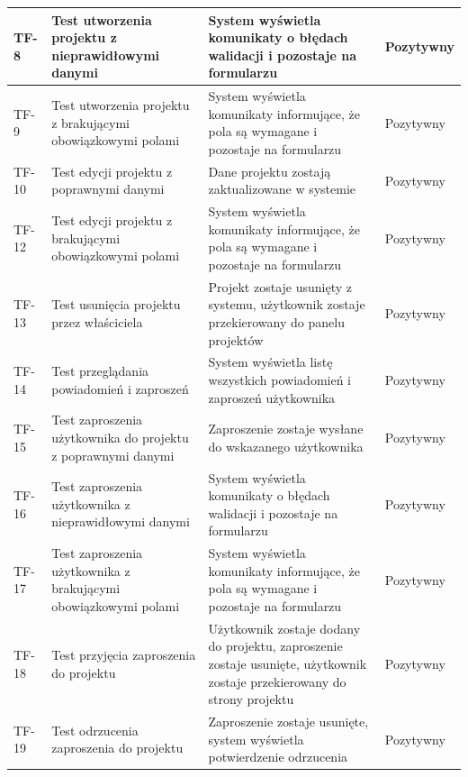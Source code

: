 \begin{longtable}{|p{2cm}|p{6cm}|p{5cm}|p{2.5cm}|}
TF-8 & Test utworzenia projektu z nieprawidłowymi danymi & System wyświetla komunikaty o błędach walidacji i pozostaje na formularzu & Pozytywny \\ \hline

TF-9 & Test utworzenia projektu z brakującymi obowiązkowymi polami & System wyświetla komunikaty informujące, że pola są wymagane i pozostaje na formularzu & Pozytywny \\ \hline

TF-10 & Test edycji projektu z poprawnymi danymi & Dane projektu zostają zaktualizowane w systemie & Pozytywny \\ \hline

TF-12 & Test edycji projektu z brakującymi obowiązkowymi polami & System wyświetla komunikaty informujące, że pola są wymagane i pozostaje na formularzu & Pozytywny \\ \hline

TF-13 & Test usunięcia projektu przez właściciela & Projekt zostaje usunięty z systemu, użytkownik zostaje przekierowany do panelu projektów & Pozytywny \\ \hline

TF-14 & Test przeglądania powiadomień i zaproszeń & System wyświetla listę wszystkich powiadomień i zaproszeń użytkownika & Pozytywny \\ \hline

TF-15 & Test zaproszenia użytkownika do projektu z poprawnymi danymi & Zaproszenie zostaje wysłane do wskazanego użytkownika & Pozytywny \\ \hline

TF-16 & Test zaproszenia użytkownika z nieprawidłowymi danymi & System wyświetla komunikaty o błędach walidacji i pozostaje na formularzu & Pozytywny \\ \hline

TF-17 & Test zaproszenia użytkownika z brakującymi obowiązkowymi polami & System wyświetla komunikaty informujące, że pola są wymagane i pozostaje na formularzu & Pozytywny \\ \hline

TF-18 & Test przyjęcia zaproszenia do projektu & Użytkownik zostaje dodany do projektu, zaproszenie zostaje usunięte, użytkownik zostaje przekierowany do strony projektu & Pozytywny \\ \hline

TF-19 & Test odrzucenia zaproszenia do projektu & Zaproszenie zostaje usunięte, system wyświetla potwierdzenie odrzucenia & Pozytywny \\ \hline


\end{longtable}
